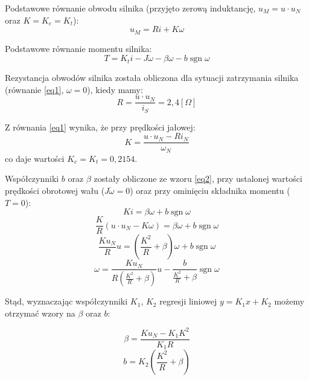 \documentclass[10pt,a4paper,onecolumn]{article}
\DeclareMathOperator{\sgn}{sgn}
\begin{document}
Podstawowe równanie obwodu silnika (przyjęto zerową induktancję, $u_M = u \cdot u_N$ oraz $K = K_e = K_t$):
\begin{equation}\label{eq1}
u_M = R i + K \omega
\end{equation}

Podstawowe równanie momentu silnika:
\begin{equation}\label{eq2}
T = K_t i - J \dot{\omega} - \beta \omega - b \sgn \omega
\end{equation}

Rezystancja obwodów silnika została obliczona dla sytuacji zatrzymania silnika (równanie \ref{eq1}, $\omega = 0$), kiedy mamy:
\begin{equation}\label{eq3}
R = \frac{u \cdot u_N}{i_S} = 2,4 [\Omega]
\end{equation}

Z równania \ref{eq1} wynika, że przy prędkości jałowej:
\begin{equation}\label{eq4}
K = \frac{u \cdot u_N - R i_N}{\omega_N}
\end{equation}
co daje wartości $K_e = K_t = 0,2154$.


Współczynniki $b$ oraz $\beta$ zostały obliczone ze wzoru \ref{eq2}, przy ustalonej wartości prędkości obrotowej wału ($J\dot{\omega} = 0$) oraz przy ominięciu składnika momentu ($T = 0$):
\begin{equation}
K i = \beta \omega + b \sgn \omega 
\end{equation}
\begin{equation}
\frac{K}{R}(u \cdot u_N - K \omega) = \beta \omega + b \sgn \omega
\end{equation}
\begin{equation}
\frac{K u_N}{R} u = (\frac{K^2}{R} + \beta) \omega + b \sgn \omega
\end{equation}
\begin{equation}
\omega = \frac{K u_N}{R( \frac{K^2}{R} + \beta )}u - \frac{b}{\frac{K^2}{R} + \beta} \sgn \omega
\end{equation}

Stąd, wyznaczając współczynniki $K_1$, $K_2$ regresji liniowej $y = K_1 x + K_2$ możemy otrzymać wzory na $\beta$ oraz $b$:

\begin{equation}
\beta = \frac{K u_N - K_1 K^2}{K_1 R}
\end{equation}
\begin{equation}\label{eq10}
b = K_2 (\frac{K^2}{R} + \beta)
\end{equation}
\end{document}
